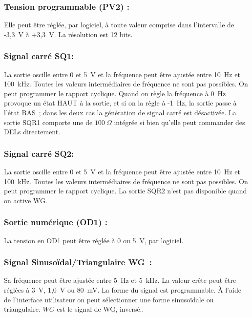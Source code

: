 \documentclass[a4paper,12pt,french]{sphinxmanual}
\begin{document}
\subsubsection{Tension programmable (PV2) :}
\label{\detokenize{1.2:tension-programmable-pv2}}
Elle peut être réglée, par logiciel, à toute valeur comprise dans
l’intervalle de -3,3 V à +3,3 V. La résolution est 12 bits.


\subsubsection{Signal carré SQ1:}
\label{\detokenize{1.2:signal-carre-sq1}}
La sortie oscille entre 0 et 5 V et la fréquence peut être ajustée
entre 10 Hz et 100 kHz. Toutes les valeurs intermédiaires de fréquence
ne sont pas possibles. On peut programmer le rapport cyclique. Quand
on règle la fréquence à 0 Hz provoque un état HAUT à la sortie, et
si on la règle à -1 Hz, la sortie passe à l’état BAS ; dans les
deux cas la génération de signal carré est désactivée. La sortie SQR1
comporte une  de \(100~\Omega\)
intégrée si bien qu’elle peut commander des DELs directement.


\subsubsection{Signal carré SQ2:}
\label{\detokenize{1.2:signal-carre-sq2}}
La sortie oscille entre 0 et 5 V et la fréquence peut être ajustée
entre 10 Hz et 100 kHz. Toutes les valeurs intermédiaires de fréquence
ne sont pas possibles. On peut programmer le rapport cyclique. La
sortie SQR2 n’est pas disponible quand on active WG.


\subsubsection{Sortie numérique (OD1) :}
\label{\detokenize{1.2:sortie-numerique-od1}}
La tension en OD1 peut être réglée à 0 ou 5 V, par logiciel.


\subsubsection{Signal Sinusoïdal/Triangulaire WG :}
\label{\detokenize{1.2:signal-sinusoidal-triangulaire-wg}}
Sa fréquence peut être ajustée entre 5 Hz et 5 kHz. La valeur crête
peut être réglées à 3 V, 1,0 V ou 80 mV. La forme du signal est
programmable. À l’aide de l’interface utilisateur on peut sélectionner
une forme sinusoïdale ou triangulaire. \(\overline{WG}\) est le signal
de WG, inversé..
\end{document}
